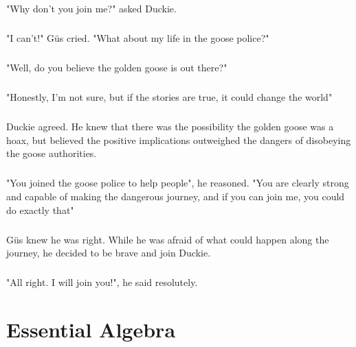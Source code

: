 \documentclass[a4paper,11pt ]{book}
\begin{document}
\paragraph{} "Why don't you join me?" asked Duckie.
\paragraph{} "I can't!" Güs cried. "What about my life in the goose police?"
\paragraph{} "Well, do you believe the golden goose is out there?"
\paragraph{} "Honestly, I'm not sure, but if the stories are true, it could change the world"
\paragraph{} Duckie agreed. He knew that there was the possibility the golden goose was a hoax, but believed the positive implications outweighed the dangers of disobeying the goose authorities. 
\paragraph{} "You joined the goose police to help people", he reasoned. "You are clearly strong and capable of making the dangerous journey, and if you can join me, you could do exactly that"
\paragraph{} Güs knew he was right. While he was afraid of what could happen along the journey, he decided to be brave and join Duckie. 
\paragraph{} "All right. I will join you!", he said resolutely. 
\chapter{Essential Algebra}
\end{document}
